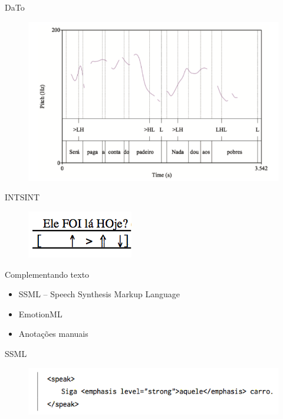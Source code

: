 \documentclass{beamer}
\begin{document}
\begin{frame}{DaTo}
    \begin{figure}
      \includegraphics[scale=0.40]{dato.png}
    \end{figure}
\end{frame}

\begin{frame}{INTSINT}
    \begin{figure}
      \includegraphics[scale=0.80]{intsint.png}
    \end{figure}
\end{frame}

\begin{frame}{Complementando texto}
  \begin{itemize}
  \item SSML -- Speech Synthesis Markup Language
  \item EmotionML
  \item Anotações manuais
  \end{itemize}
\end{frame}

\begin{frame}{SSML}
    \begin{figure}
      \includegraphics[scale=0.60]{ssml.png}
    \end{figure}
\end{frame}
\end{document}

